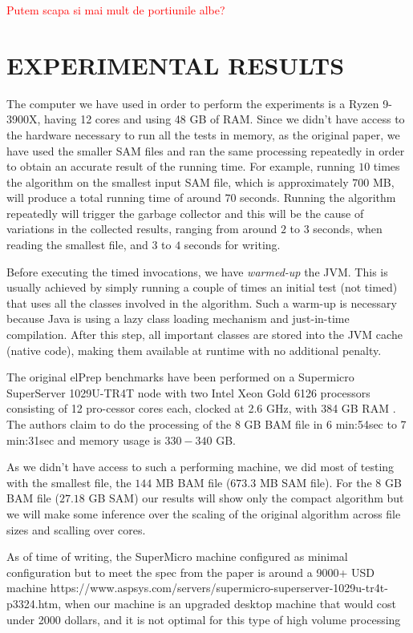 \documentclass[a4paper,twoside]{article}
\begin{document}
\textcolor{red}{Putem scapa si mai mult de portiunile albe?}





\section{\uppercase{Experimental Results}}

The computer we have used in order to perform the experiments is a Ryzen 9-3900X, having 12 cores and using 48 GB of RAM.
Since we didn't have access to the hardware necessary to run all the tests in memory, as the original paper, we have used the smaller SAM files and ran the same processing repeatedly in order to obtain an accurate result of the running time.
For example, running $10$ times the algorithm on the smallest input SAM file, which is approximately $700$ MB, will produce a total running time of around $70$ seconds. 
Running the algorithm repeatedly will trigger the garbage collector and this will be the cause of variations in the collected results, ranging from around $2$ to $3$ seconds, when reading the smallest file, and $3$ to $4$ seconds for writing.

Before executing the timed invocations, we have {\it warmed-up} the JVM. 
This is usually achieved by simply running a couple of times an initial test (not timed) that uses all the classes involved in the algorithm. Such a warm-up is necessary because Java is using a lazy class loading mechanism and just-in-time compilation. After this step, all important classes are stored into the JVM cache (native code), making them available at runtime with no additional penalty.

The original elPrep benchmarks have been performed on a Supermicro SuperServer 1029U-TR4T node with two
Intel Xeon Gold 6126 processors consisting of 12 pro-cessor cores each, clocked at 2.6 GHz, with 384 GB
RAM \cite{costanza:2019}. The authors claim to do the processing of the 8 GB BAM file in 6 min:54sec to 7 min:31sec and memory usage is $330-340$ GB.

As we didn't have access to such a performing machine, we did most of testing with the smallest file, the $144$ MB BAM file ($673.3$ MB SAM file). For the $8$ GB BAM file ($27.18$ GB SAM) our results will show only the compact algorithm but we will make some inference over the scaling of the original algorithm across file sizes and scalling over cores.

As of time of writing, the SuperMicro machine configured as minimal configuration but to meet the spec from the paper is around a 9000+ USD machine https://www.aspsys.com/servers/supermicro-superserver-1029u-tr4t-p3324.htm, when our machine is an upgraded desktop machine that would cost under 2000 dollars, and it is not optimal for this type of high volume processing
\end{document}
